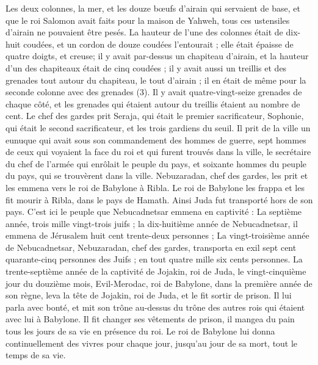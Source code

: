 \begin{multicols}{2}
Les deux colonnes, la mer, et les douze bœufs d'airain qui servaient de base, et que le roi Salomon avait faits pour la maison de Yahweh, tous ces ustensiles d'airain ne pouvaient être pesés.
La hauteur de l'une des colonnes était de dix-huit coudées, et un cordon de douze coudées l'entourait ; elle était épaisse de quatre doigts, et creuse;
il y avait par-dessus un chapiteau d'airain, et la hauteur d'un des chapiteaux était de cinq coudées ; il y avait aussi un treillis et des grenades tout autour du chapiteau, le tout d'airain ; il en était de même pour la seconde colonne avec des grenades\FTNT{} (3).
Il y avait quatre-vingt-seize grenades de chaque côté, et les grenades qui étaient autour du treillis étaient au nombre de cent.
Le chef des gardes prit Seraja, qui était le premier sacrificateur, Sophonie, qui était le second sacrificateur, et les trois gardiens du seuil.
Il prit de la ville un eunuque qui avait sous son commandement des hommes de guerre, sept hommes de ceux qui voyaient la face du roi et qui furent trouvés dans la ville, le secrétaire du chef de l'armée qui enrôlait le peuple du pays, et soixante hommes du peuple du pays, qui se trouvèrent dans la ville.
Nebuzaradan, chef des gardes, les prit et les emmena vers le roi de Babylone à Ribla.
Le roi de Babylone les frappa et les fit mourir à Ribla, dans le pays de Hamath. Ainsi Juda fut transporté hors de son pays.
C'est ici le peuple que Nebucadnetsar emmena en captivité : La septième année, trois mille vingt-trois juifs ;
la dix-huitième année de Nebucadnetsar, il emmena de Jérusalem huit cent trente-deux personnes ;
La vingt-troisième année de Nebucadnetsar, Nebuzaradan, chef des gardes, transporta en exil sept cent quarante-cinq personnes des Juifs ; en tout quatre mille six cents personnes.
La trente-septième année de la captivité de Jojakin, roi de Juda, le vingt-cinquième jour du douzième mois, Evil-Merodac, roi de Babylone, dans la première année de son règne, leva la tête de Jojakin, roi de Juda, et le fit sortir de prison.
Il lui parla avec bonté, et mit son trône au-dessus du trône des autres rois qui étaient avec lui à Babylone.
Il fit changer ses vêtements de prison, il mangea du pain tous les jours de sa vie en présence du roi.
Le roi de Babylone lui donna continuellement des vivres pour chaque jour, jusqu'au jour de sa mort, tout le temps de sa vie.
\PPE{}
\end{multicols}

